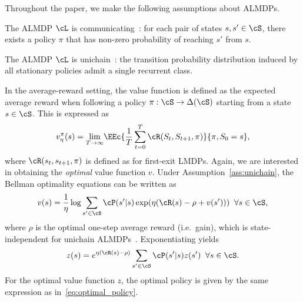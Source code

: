 Throughout the paper, we make the following assumptions about ALMDPs.

\begin{assumption}
  The ALMDP $\cL$ is communicating~\citep{Puterman1994}: for each pair of states $s,s'\in\cS$, there exists a policy $\pi$ that has non-zero probability of reaching $s'$ from $s$.
  \label{ass:communicating}
\end{assumption}

\begin{assumption}
  The ALMDP $\cL$ is unichain~\citep{Puterman1994}: the transition probability distribution induced by all stationary policies admit a single recurrent class.
  \label{ass:unichain}
\end{assumption}

In the average-reward setting, the value function is defined as the expected average reward when following a policy $\pi:\cS\rightarrow\Delta(\cS)$ starting from a state $s\in\cS$. This is expressed as
\begin{equation}
  v_\eta^\pi(s) = \underset{T\rightarrow\infty}\lim \EEc{\frac{1}{T} \sum_{t=0}^T \cR(S_t, S_{t+1}, \pi)}{\pi, S_0 = s},
  \label{eq:value_function_almdp}
\end{equation}
where $\cR(s_t, s_{t+1}, \pi)$ is defined as for first-exit LMDPs.
Again, we are interested in obtaining the \textit{optimal} value function $v$. Under Assumption~\ref{ass:unichain}, the Bellman optimality equations can be written as
\begin{equation}
  v(s) = \frac 1 \eta \log{\sum_{s'\in\cS}\cP(s'\lvert s)\exp(\eta(\cR(s) - \rho + v(s')))} \;\;\forall s\in\cS,
  \label{eq:boe_almdp}
\end{equation}
where $\rho$ is the optimal one-step average reward (i.e.~gain), which is state-independent for unichain ALMDPs~\cite{Todorov2006}. Exponentiating yields
\begin{equation}
  z(s) = e^{\eta(\cR(s) - \rho)} \sum_{s'\in\cS}\cP(s'\lvert s)z(s') \;\;\forall s\in\cS.
  \label{eq:boe_z_almdp}
\end{equation}
For the optimal value function $z$, the optimal policy is given by the same expression as in~\eqref{eq:optimal_policy}.

